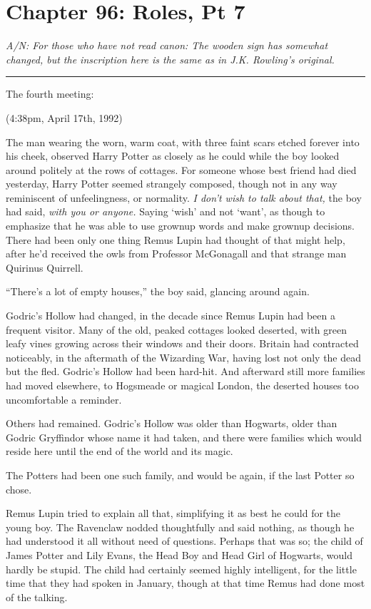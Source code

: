 \chapter{Chapter 96: Roles, Pt 7}
\emph{A/N: For those who have not read canon: The wooden sign has somewhat changed, but the inscription here is the same as in J.K. Rowling's original.}

\begin{center}\rule{3in}{0.4pt}\end{center}

The fourth meeting:

(4:38pm, April 17th, 1992)

The man wearing the worn, warm coat, with three faint scars etched forever into his cheek, observed Harry Potter as closely as he could while the boy looked around politely at the rows of cottages. For someone whose best friend had died yesterday, Harry Potter seemed strangely composed, though not in any way reminiscent of unfeelingness, or normality. \emph{I don't wish to talk about that,} the boy had said, \emph{with you or anyone.} Saying `wish' and not `want', as though to emphasize that he was able to use grownup words and make grownup decisions. There had been only one thing Remus Lupin had thought of that might help, after he'd received the owls from Professor McGonagall and that strange man Quirinus Quirrell.

``There's a lot of empty houses,'' the boy said, glancing around again.

Godric's Hollow had changed, in the decade since Remus Lupin had been a frequent visitor. Many of the old, peaked cottages looked deserted, with green leafy vines growing across their windows and their doors. Britain had contracted noticeably, in the aftermath of the Wizarding War, having lost not only the dead but the fled. Godric's Hollow had been hard-hit. And afterward still more families had moved elsewhere, to Hogsmeade or magical London, the deserted houses too uncomfortable a reminder.

Others had remained. Godric's Hollow was older than Hogwarts, older than Godric Gryffindor whose name it had taken, and there were families which would reside here until the end of the world and its magic.

The Potters had been one such family, and would be again, if the last Potter so chose.

Remus Lupin tried to explain all that, simplifying it as best he could for the young boy. The Ravenclaw nodded thoughtfully and said nothing, as though he had understood it all without need of questions. Perhaps that was so; the child of James Potter and Lily Evans, the Head Boy and Head Girl of Hogwarts, would hardly be stupid. The child had certainly seemed highly intelligent, for the little time that they had spoken in January, though at that time Remus had done most of the talking.

